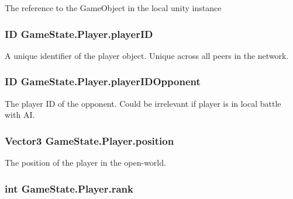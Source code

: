 The reference to the Game\-Object in the local unity instance 

\hypertarget{class_game_state_1_1_player_acbd28d89e6eb8611aa66452ec31e9133}{
\subsubsection[{player\-I\-D}]{\setlength{\rightskip}{0pt plus 5cm}I\-D Game\-State.\-Player.\-player\-I\-D}}\label{class_game_state_1_1_player_acbd28d89e6eb8611aa66452ec31e9133}


A unique identifier of the player object. Unique across all peers in the network. 

\hypertarget{class_game_state_1_1_player_aaed188c94b7f6be4dabe39744aa818ca}{
\subsubsection[{player\-I\-D\-Opponent}]{\setlength{\rightskip}{0pt plus 5cm}I\-D Game\-State.\-Player.\-player\-I\-D\-Opponent}}\label{class_game_state_1_1_player_aaed188c94b7f6be4dabe39744aa818ca}


The player I\-D of the opponent. Could be irrelevant if player is in local battle with A\-I. 

\hypertarget{class_game_state_1_1_player_a24a9ccd0325cae667f125821b3be79c2}{
\subsubsection[{position}]{\setlength{\rightskip}{0pt plus 5cm}Vector3 Game\-State.\-Player.\-position}}\label{class_game_state_1_1_player_a24a9ccd0325cae667f125821b3be79c2}


The position of the player in the open-\/world. 

\hypertarget{class_game_state_1_1_player_aa6cd14ba1f335990c39dd99334933147}{
\subsubsection[{rank}]{\setlength{\rightskip}{0pt plus 5cm}int Game\-State.\-Player.\-rank}}\label{class_game_state_1_1_player_aa6cd14ba1f335990c39dd99334933147}


